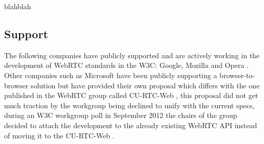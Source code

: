 blahblah

\subsection{Support}

The following companies have publicly supported and are actively working in the development of WebRTC standards in the W3C: Google, Mozilla and Opera \cite{googleAnnouncement}. Other companies such as Microsoft have been publicly supporting a browser-to-browser solution but have provided their own proposal which differs with the one published in the WebRTC group called CU-RTC-Web \cite{curtcweb}, this proposal did not get much traction by the workgroup being declined to unify with the current specs, during an W3C workgroup poll in September 2012 the chairs of the group decided to attach the development to the already existing WebRTC API instead of moving it to the CU-RTC-Web \cite{curtcpoll}.